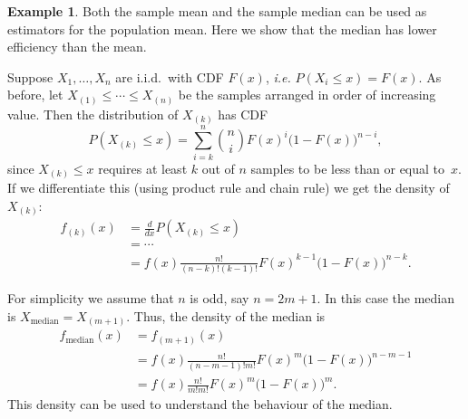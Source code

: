 \documentclass[
  a4paper,
]{article}
\theoremstyle{definition}
\theoremstyle{definition}
\newtheorem{example}{Example}[section]
\theoremstyle{definition}
\theoremstyle{definition}
\theoremstyle{remark}
\begin{document}
\begin{example}
Both the sample mean and the sample median can be used as estimators
for the population mean. Here we show that the median has lower efficiency
than the mean.

Suppose \(X_1,\ldots, X_n\) are i.i.d.~with CDF \(F(x)\), \emph{i.e.}
\(P(X_i \leq x) = F(x)\). As before, let \(X_{(1)} \leq \cdots \leq
X_{(n)}\) be the samples arranged in order of increasing value.
Then the distribution of \(X_{(k)}\) has CDF
\begin{equation*}
  P(X_{(k)} \leq x)
  = \sum_{i=k}^n {n\choose i} F(x)^i \bigl(1-F(x)\bigr)^{n-i},
\end{equation*}
since \(X_{(k)} \leq x\) requires at least \(k\) out of \(n\) samples to be
less than or equal to~\(x\).
If we differentiate this (using product rule and chain rule) we get
the density of \(X_{(k)}\):
\begin{align*}
  f_{(k)}(x)
  &= \frac{d}{dx} P(X_{(k)} \leq x) \\
  &= \cdots \\
  &= f(x)\frac{n!}{(n-k)! (k-1)!} F(x)^{k-1}\bigl(1-F(x)\bigr)^{n-k}.
\end{align*}

For simplicity we assume that \(n\) is odd, say \(n = 2m+1\). In this case the
median is \(X_\mathrm{median} = X_{(m+1)}\). Thus, the density of the median is
\begin{align*}
  f_\mathrm{median}(x)
  &= f_{(m+1)}(x) \\
  &= f(x)\frac{n!}{(n-m-1)! m!} F(x)^m\bigl(1-F(x)\bigr)^{n-m-1} \\
  &= f(x)\frac{n!}{m! m!} F(x)^m\bigl(1-F(x)\bigr)^m.
\end{align*}
This density can be used to understand the behaviour of the median.


\end{example}
\end{document}
